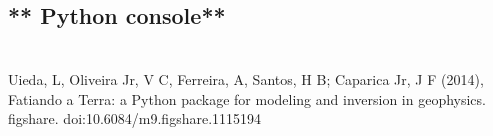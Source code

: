 \documentclass[a4paper,10pt,english]{sphinxmanual}
\begin{document}
\subsection{}
\label{\detokenize{manual_geology:geologic-data}}\label{\detokenize{manual_geology::doc}}

\subsubsection{}
\label{\detokenize{manual_geology:loading-geologic-data}}

\subsection{}
\label{\detokenize{manual_export_figure:export-figure}}\label{\detokenize{manual_export_figure::doc}}

\subsection{** Python console**}
\label{\detokenize{manual_python_console:python-console}}\label{\detokenize{manual_python_console::doc}}

\section{}
\label{\detokenize{tutorial:tutorial}}\label{\detokenize{tutorial::doc}}

\section{}
\label{\detokenize{contribute:contibute}}\label{\detokenize{contribute:contribute}}\label{\detokenize{contribute::doc}}

\section{}
\label{\detokenize{references:references}}\label{\detokenize{references:id1}}\label{\detokenize{references::doc}}

Uieda, L, Oliveira Jr, V C, Ferreira, A, Santos, H B; Caparica Jr, J F (2014), Fatiando a Terra: a Python package for
modeling and inversion in geophysics. figshare. doi:10.6084/m9.figshare.1115194
\end{document}
